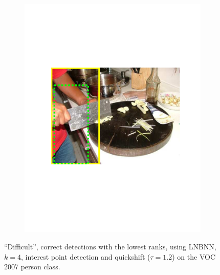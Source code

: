 \begin{figure}[hbt]
\begin{subfigure}[b]{0.45\textwidth}
        \includegraphics[width=\textwidth]{TP30705}
        \caption{}
        \label{fig:dettn4}
    \end{subfigure}
    \caption{``Difficult'', correct detections with the lowest ranks, using LNBNN, $k=4$, interest point detection and quickshift ($\tau=1.2$) on the VOC 2007 person class.}
    \label{fig:dettn}
\end{figure}

